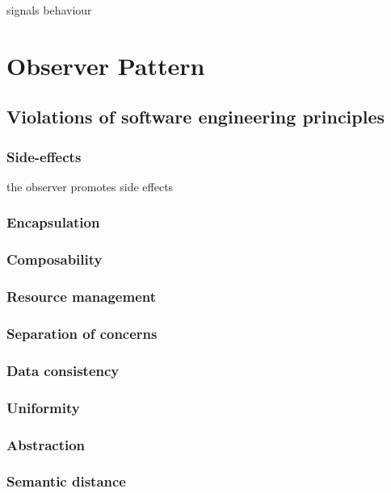 \documentclass[acmtoc, authorversion]{acmart}
\begin{document}
signals behaviour~\cite{Bainomugisha:2013}

\section{Observer Pattern}

\cite{Gamma:1995}

\subsection{Violations of software engineering principles}

\subsubsection{Side-effects}

the observer promotes side effects

\subsubsection{Encapsulation}

\subsubsection{Composability}

\subsubsection{Resource management}

\subsubsection{Separation of concerns}

\subsubsection{Data consistency}

\subsubsection{Uniformity}

\subsubsection{Abstraction}

\subsubsection{Semantic distance}
\end{document}
